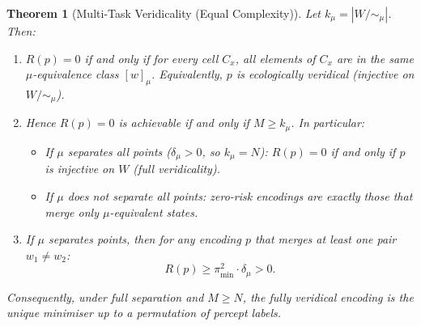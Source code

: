 \documentclass[12pt]{article}
\newtheorem{theorem}{Theorem}[section]
\newcommand{\dmu}{\delta_\mu}
\newcommand{\kmu}{k_\mu}
\newcommand{\pimin}{\pi_{\min}}
\begin{document}
\begin{theorem}[Multi-Task Veridicality (Equal Complexity)]\label{thm:veridicality}
Let $\kmu = |W/{\sim_\mu}|$. Then:

\begin{enumerate}[label=(\alph*)]
\item $R(p) = 0$ if and only if for every cell $C_x$, all elements of $C_x$ are in the same $\mu$-equivalence class $[w]_\mu$. Equivalently, $p$ is ecologically veridical (injective on $W/{\sim_\mu}$).

\item Hence $R(p) = 0$ is achievable if and only if $M \ge \kmu$. In particular:
\begin{itemize}
\item If $\mu$ separates all points ($\dmu > 0$, so $\kmu = N$): $R(p) = 0$ if and only if $p$ is injective on $W$ (full veridicality).
\item If $\mu$ does not separate all points: zero-risk encodings are exactly those that merge only $\mu$-equivalent states.
\end{itemize}

\item If $\mu$ separates points, then for any encoding $p$ that merges at least one pair $w_1 \ne w_2$:
\begin{equation}\label{eq:risk-lower-bound}
R(p) \ge \pimin^2 \cdot \dmu > 0.
\end{equation}
\end{enumerate}
Consequently, under full separation and $M \ge N$, the fully veridical encoding is the unique minimiser \emph{up to a permutation of percept labels}.
\end{theorem}
\end{document}
